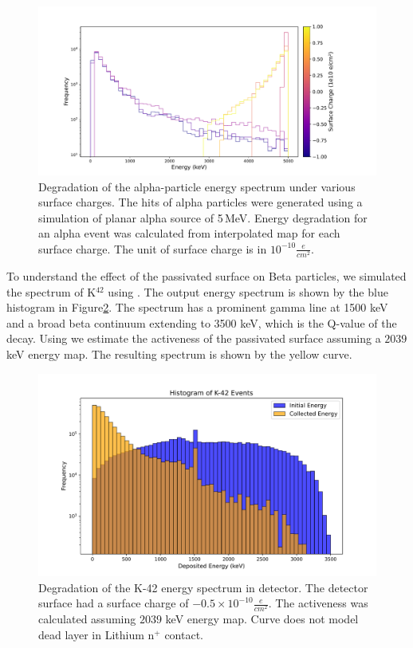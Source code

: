 \begin{figure}%
  \centering
  \includegraphics[trim={2cm 0.5cm 4.5cm 1.7cm},clip,width=0.99\linewidth]{ch5/figs/eng_deg_hist.pdf}
  \caption{Degradation of the alpha-particle energy spectrum under various surface charges. The hits of alpha particles were generated using a {\geant} simulation of planar alpha source of 5\,MeV. Energy degradation for an alpha event was calculated from interpolated map for each surface charge. The unit of surface charge is in $10^{-10} \frac{e}{cm^2}$.}
  \label{fig:eng_spec_degradation}
\end{figure}

To understand the effect of the passivated surface on Beta particles, we simulated the spectrum of K$^{42}$ using {\geant}. The output energy spectrum is shown by the blue histogram in Figure\ref{ch5_figs_k_42_degrad}. The spectrum has a prominent gamma line at 1500 keV and a broad beta continuum extending to 3500 keV, which is the Q-value of the decay. Using {\ehd} we estimate the activeness of the passivated surface assuming a $2039$ keV energy map. The resulting spectrum is shown by the yellow curve.

\begin{figure}%
  \centering
  \includegraphics[trim={1.5cm 0.0cm 2cm 1.76cm},clip,width=0.99\linewidth]{ch5/figs/k_42_beta_spectrum.pdf}
  \caption{Degradation of the K-42 energy spectrum in {\ponama} detector. The detector surface had a surface charge of $- 0.5 \times 10^{-10} \frac{e}{cm^2}$. The activeness was calculated assuming $2039$ keV energy map. Curve does not model dead layer in Lithium n$^+$ contact.}
  \label{ch5_figs_k_42_degrad}
\end{figure}

